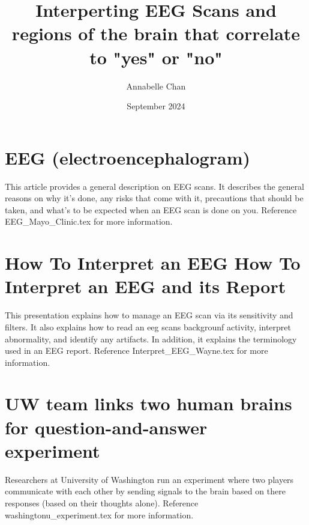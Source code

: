 \documentclass[12pt]{article}
\title{Interperting EEG Scans and regions of the brain that correlate to "yes" or "no"}
\author{Annabelle Chan}
\date{September 2024}
\begin{document}
\maketitle

\section{EEG (electroencephalogram)}
This article provides a general description on EEG scans. It describes the general reasons on why it's done, any risks that come with it, precautions that should be taken, and what's to be expected when an EEG scan is done on you. Reference EEG\_Mayo\_Clinic.tex for more information.

\section{How To Interpret an EEG How To Interpret an EEG and its Report}
This presentation explains how to manage an EEG scan via its sensitivity and filters. It also explains how to read an eeg scans backgrounf activity, interpret abnormality, and identify any artifacts. In addition, it explains the terminology used in an EEG report. Reference Interpret\_EEG\_Wayne.tex for more information.

\section{UW team links two human brains for question-and-answer experiment}
Researchers at University of Washington run an experiment where two players communicate with each other by sending signals to the brain based on there responses (based on their thoughts alone). Reference washingtonu\_experiment.tex for more information.
\end{document}
